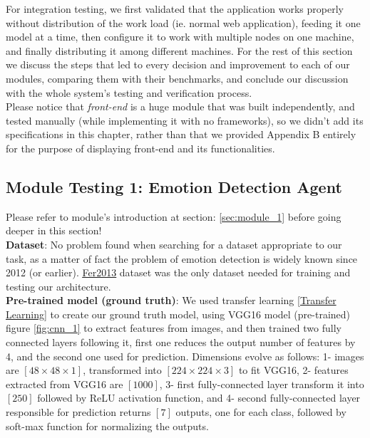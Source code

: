 For integration testing, we first validated that the application works properly without distribution of the work load (ie. normal web application), feeding it one model at a time, then configure it to work with multiple nodes on one machine, and finally distributing it among different machines. For the rest of this section we discuss the steps that led to every decision and improvement to each of our modules, comparing them with their benchmarks, and conclude our discussion with the whole system's testing and verification process.\\

Please notice that \textit{front-end} is a huge module that was built independently, and tested manually (while implementing it with no frameworks), so we didn't add its specifications in this chapter, rather than that we provided Appendix B entirely for the purpose of displaying front-end and its functionalities.




\newpage
\subsection{Module Testing 1: Emotion Detection Agent}
\label{sec:emotion_testing}
Please refer to module's introduction at section: \ref{sec:module_1} before going deeper in this section!\\

\textbf{Dataset}: No problem found when searching for a dataset appropriate to our task, as a matter of fact the problem of emotion detection is widely known since 2012 (or earlier). \href{https://www.kaggle.com/c/challenges-in-representation-learning-facial-expression-recognition-challenge/data}{\underline{Fer2013}} dataset was the only dataset needed for training and testing our architecture.\\

\textbf{Pre-trained model (ground truth)}: We used transfer learning \ref{Transfer Learning} to create our ground truth model, using VGG16 model (pre-trained) figure \ref{fig:cnn_1} to extract features from images, and then trained two fully connected layers following it, first one reduces the output number of features by 4, and the second one used for prediction. Dimensions evolve as follows: 1- images are $[48 \times 48 \times 1]$, transformed into $[224 \times 224 \times 3]$ to fit VGG16, 2- features extracted from VGG16 are $[1000]$, 3- first fully-connected layer transform it into $[250]$ followed by ReLU activation function, and  4- second fully-connected layer responsible for prediction returns $[7]$ outputs, one for each class, followed by soft-max function for normalizing the outputs.\\

